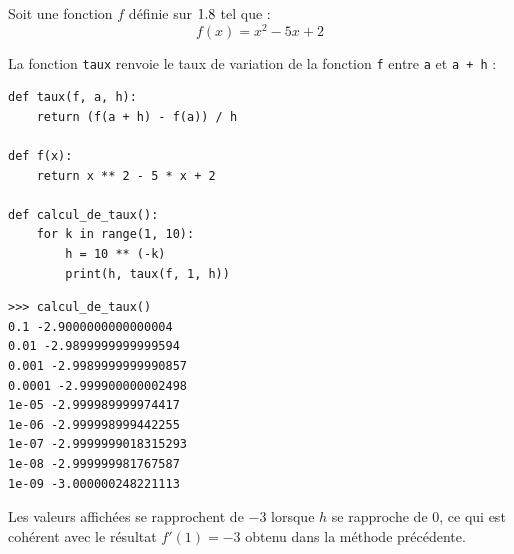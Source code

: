 \begin{ex}
	Soit une fonction $f$ définie sur $1.8$ tel que :
	\[
		f(x)=x^2-5x+2
	\]

	La fonction \texttt{taux} renvoie le taux de variation de la fonction \texttt{f} entre \texttt{a} et \texttt{a + h} :

	\begin{lstlisting}
def taux(f, a, h):
    return (f(a + h) - f(a)) / h

def f(x):
    return x ** 2 - 5 * x + 2

def calcul_de_taux():
    for k in range(1, 10):
        h = 10 ** (-k)
        print(h, taux(f, 1, h))
\end{lstlisting}

	\begin{lstlisting}
>>> calcul_de_taux()
0.1 -2.9000000000000004
0.01 -2.9899999999999594
0.001 -2.9989999999990857
0.0001 -2.999900000002498
1e-05 -2.999989999974417
1e-06 -2.999998999442255
1e-07 -2.9999999018315293
1e-08 -2.999999981767587
1e-09 -3.000000248221113
\end{lstlisting}

	Les valeurs affichées se rapprochent de $-3$ lorsque $h$ se rapproche de $0$, ce qui est cohérent avec le résultat $f'(1) = -3$ obtenu dans la méthode précédente.
\end{ex}

